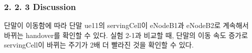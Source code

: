     \subsubsection*{2. 2. 3 Discussion}
    \vspace{-3mm}
        단말이 이동함에 따라 단말 ue11의 servingCell이 eNodeB1과 eNodeB2로 계속해서 바뀌는 handover를 확인할 수 있다. 실험 2-1과 비교할 때, 단말의 이동 속도 증가로 servingCell이 바뀌는 주기가 2배 더 빨라진 것을 확인할 수 있다.